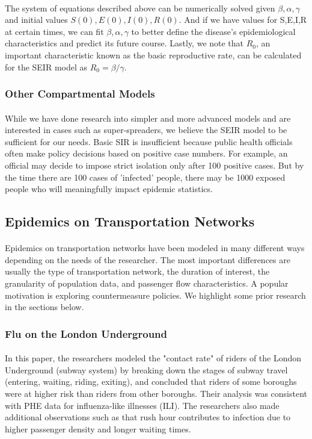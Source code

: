 \documentclass[12pt, a4, epsf] {article}
\theoremstyle{plain}
\theoremstyle{definition}
\begin{document}
\paragraph{}
The system of equations described above can be numerically solved given $\beta,\alpha,\gamma$ and initial values $S(0),E(0),I(0),R(0)$. And if we have values for S,E,I,R at certain times, we can fit $\beta,\alpha,\gamma$ to better define the disease's epidemiological characteristics and predict its future course. Lastly, we note that $R_0$, an important characteristic known as the basic reproductive rate, can be calculated for the SEIR model as $R_0 = \beta/\gamma$.
\subsubsection{Other Compartmental Models}
\paragraph{}
While we have done research into simpler and more advanced models and are interested in cases such as super-spreaders, we believe the SEIR model to be sufficient for our needs. Basic SIR is insufficient because public health officials often make policy decisions based on positive case numbers. For example, an official may decide to impose strict isolation only after 100 positive cases. But by the time there are 100 cases of 'infected' people, there may be 1000 exposed people who will meaningfully impact epidemic statistics.
\subsection{Epidemics on Transportation Networks}
\paragraph{}
Epidemics on transportation networks have been modeled in many different ways depending on the needs of the researcher. The most important differences are usually the type of transportation network, the duration of interest, the granularity of population data, and passenger flow characteristics. A popular motivation is exploring countermeasure policies. We highlight some prior research in the sections below.
\subsubsection{Flu on the London Underground \cite{gosce_johansson_2018}}
\paragraph{}
In this paper, the researchers modeled the "contact rate" of riders of the London Underground (subway system) by breaking down the stages of subway travel (entering, waiting, riding, exiting), and concluded that riders of some boroughs were at higher risk than riders from other boroughs. Their analysis was consistent with PHE data for influenza-like illnesses (ILI). The researchers also made additional observations such as that rush hour contributes to infection due to higher passenger density and longer waiting times.
\end{document}
